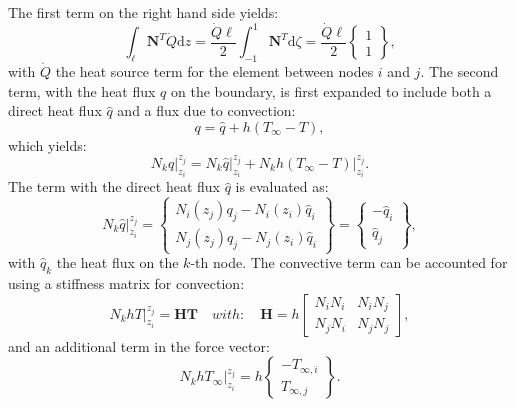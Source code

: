 \documentclass[10pt, a4paper, twoside, headinclude,footinclude, BCOR5mm]{scrartcl}
\begin{document}
The first term on the right hand side yields:
\begin{equation*}
  \int_\ell \mathbf{N}^T \dot{Q} \text{d}z =
  \frac{\dot{Q}\ell}{2} \int_{-1}^{1} \mathbf{N}^T \text{d}\zeta   = \frac{ \dot{Q} \ell}{2} \begin{Bmatrix} 1 \\ 1 \end{Bmatrix},
\end{equation*}
with \(\dot{Q}\) the heat source term for the element between nodes \(i\) and \(j\). The second term, with the heat flux \(q\) on the boundary, is first expanded to include both a direct heat flux \(\hat{q}\) and a flux due to convection:
\begin{equation*}
  q = \hat{q} + h(T_{\infty}-T),
\end{equation*}
which yields:
\begin{equation*}
  N_k q \Biggr|_{z_i}^{z_j} = N_k \hat{q} \Biggr|_{z_i}^{z_j} +
                             N_k h (T_{\infty}-T) \Biggr|_{z_i}^{z_j}.
\end{equation*}
The term with the direct heat flux \(\hat{q}\) is evaluated as:
\begin{equation*}
  N_k \hat{q} \Biggr|_{z_i}^{z_j} =
     \begin{Bmatrix} N_i(z_j)q_j - N_i(z_i) \hat{q}_i \\
                     N_j(z_j)q_j - N_j(z_i) \hat{q}_i \end{Bmatrix} =
     \begin{Bmatrix} - \hat{q}_i \\
                       \hat{q}_j \end{Bmatrix},
\end{equation*}
with \(\hat{q}_k\) the heat flux on the \(k\)-th node. The convective term can be accounted for using a stiffness matrix for convection:
\begin{equation}
  N_k h T \Biggr|_{z_i}^{z_j} = \mathbf{H} \mathbf{T} \quad{with:}\quad
      \mathbf{H} = h\left[\begin{matrix} N_i N_i & N_i N_j \\
                                       N_j N_i & N_j N_j \end{matrix}\right],
\label{eq:H}
\end{equation}
and an additional term in the force vector:
\begin{equation*}
  N_k h T_{\infty} \Biggr|_{z_i}^{z_j} =
     h\begin{Bmatrix} - T_{\infty,i} \\
                        T_{\infty,j} \end{Bmatrix}.
\end{equation*}
\end{document}
